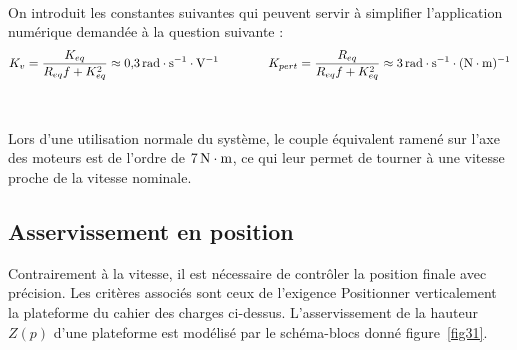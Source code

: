 ~\

On introduit les constantes suivantes qui peuvent servir à simplifier l'application numérique demandée à la question suivante :
\[
K_v=\dfrac{K_{eq}}{R_{eq}f+K_{eq}^2}\approx0{,}3\,\mathrm{rad\cdot s^{-1}\cdot V^{-1}}\qquad\qquad
K_{pert}=\dfrac{R_{eq}}{R_{eq}f+K_{eq}^2}\approx3\,\mathrm{rad\cdot s^{-1}\cdot(N\cdot m)^{-1}}
\]



~\

Lors d'une utilisation normale du système, le couple équivalent ramené sur l'axe des moteurs est de l'ordre de $7\,\mathrm{N\cdot m}$, ce qui leur permet de tourner à une vitesse proche de la vitesse nominale.

\subsection{Asservissement en position}

Contrairement à la vitesse, il est nécessaire de contrôler la position finale avec précision. Les critères associés sont ceux de l'exigence \og Positionner verticalement la plateforme \fg{} du cahier des charges ci-dessus. L'asservissement de la hauteur $Z(p)$ d'une plateforme est modélisé par le schéma-blocs donné figure~\ref{fig31}. 


\newpage

